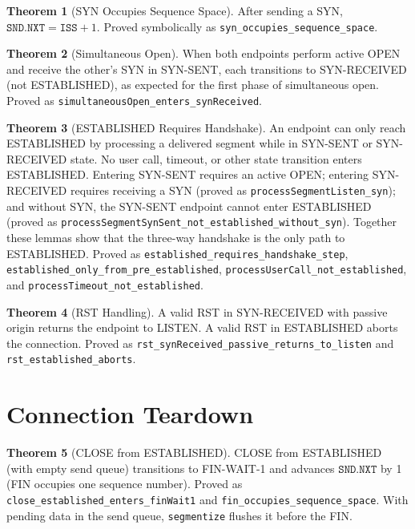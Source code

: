 \documentclass[11pt]{article}
\theoremstyle{definition}
\newtheorem{theorem}{Theorem}[section]
\begin{document}
\begin{theorem}[SYN Occupies Sequence Space]
After sending a SYN, $\texttt{SND.NXT} = \texttt{ISS} + 1$.
Proved symbolically as \texttt{syn\_occupies\_sequence\_space}.
\end{theorem}

\begin{theorem}[Simultaneous Open]
When both endpoints perform active OPEN and receive the other's SYN in
SYN-SENT, each transitions to SYN-RECEIVED (not ESTABLISHED), as expected
for the first phase of simultaneous open.
Proved as \texttt{simultaneousOpen\_enters\_synReceived}.
\end{theorem}

\begin{theorem}[ESTABLISHED Requires Handshake]
An endpoint can only reach ESTABLISHED by processing a delivered segment while
in SYN-SENT or SYN-RECEIVED state. No user call, timeout, or other state
transition enters ESTABLISHED. Entering SYN-SENT requires an active OPEN;
entering SYN-RECEIVED requires receiving a SYN (proved as
\texttt{processSegmentListen\_syn}); and without SYN, the SYN-SENT endpoint
cannot enter ESTABLISHED (proved as
\texttt{processSegmentSynSent\_not\_established\_without\_syn}). Together these
lemmas show that the three-way handshake is the only path to ESTABLISHED.
Proved as \texttt{established\_requires\_handshake\_step},
\texttt{established\_only\_from\_pre\_established},
\texttt{processUserCall\_not\_established},
and \texttt{processTimeout\_not\_established}.
\end{theorem}

\begin{theorem}[RST Handling]
A valid RST in SYN-RECEIVED with passive origin returns the endpoint to
LISTEN. A valid RST in ESTABLISHED aborts the connection.
Proved as \texttt{rst\_synReceived\_passive\_returns\_to\_listen} and
\texttt{rst\_established\_aborts}.
\end{theorem}

\section{Connection Teardown}
\label{sec:teardown}

\begin{theorem}[CLOSE from ESTABLISHED]
CLOSE from ESTABLISHED (with empty send queue) transitions to FIN-WAIT-1
and advances $\texttt{SND.NXT}$ by 1 (FIN occupies one sequence number).
Proved as \texttt{close\_established\_enters\_finWait1} and
\texttt{fin\_occupies\_sequence\_space}. With pending data in the send
queue, \texttt{segmentize} flushes it before the FIN.
\end{theorem}
\end{document}
